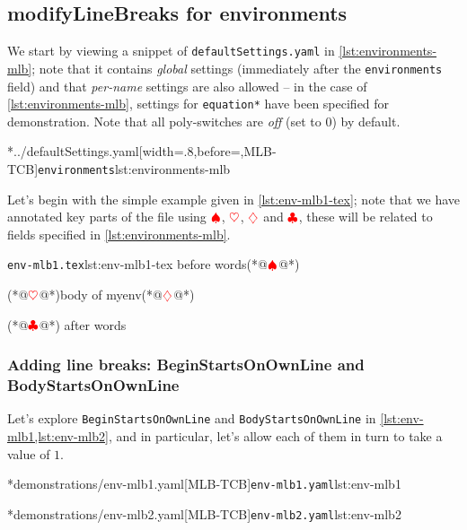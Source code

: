 \subsection{modifyLineBreaks for environments}\label{sec:modifylinebreaks-environments}
	We start by viewing a snippet of \texttt{defaultSettings.yaml} in
	\cref{lst:environments-mlb}; note that it contains \emph{global} settings
	(immediately after the \texttt{environments} field) and that
	\emph{per-name} settings are also allowed -- in the case of
	\cref{lst:environments-mlb}, settings for \texttt{equation*} have been specified
	for demonstration. Note that all poly-switches are \emph{off} (set to 0) by
	default.

	\cmhlistingsfromfile[style=modifylinebreaksEnv]*{../defaultSettings.yaml}[width=.8\linewidth,before=\centering,MLB-TCB]{\texttt{environments}}{lst:environments-mlb}

	Let's begin with the simple example given in \cref{lst:env-mlb1-tex}; note that we
	have annotated key parts of the file using $\color{red}\spadesuit$,
	$\color{red}\heartsuit$, $\color{red}\diamondsuit$ and $\color{red}\clubsuit$,
	these will be related to fields specified in \cref{lst:environments-mlb}.

	\begin{cmhlistings}[style=tcblatex,escapeinside={(*@}{@*)}]{\texttt{env-mlb1.tex}}{lst:env-mlb1-tex}
before words(*@$\color{red}\spadesuit$@*) \begin{myenv}(*@$\color{red}\heartsuit$@*)body of myenv(*@$\color{red}\diamondsuit$@*)\end{myenv}(*@$\color{red}\clubsuit$@*) after words
\end{cmhlistings}

\subsubsection{Adding line breaks: BeginStartsOnOwnLine and BodyStartsOnOwnLine}
	Let's explore \texttt{BeginStartsOnOwnLine} and \texttt{BodyStartsOnOwnLine} in
	\cref{lst:env-mlb1,lst:env-mlb2}, and in particular, let's allow each of them in turn to take
	a value of $1$.

	\begin{minipage}{.45\textwidth}
		\cmhlistingsfromfile[style=yaml-LST]*{demonstrations/env-mlb1.yaml}[MLB-TCB]{\texttt{env-mlb1.yaml}}{lst:env-mlb1}
	\end{minipage}
	\hfill
	\begin{minipage}{.45\textwidth}
		\cmhlistingsfromfile[style=yaml-LST]*{demonstrations/env-mlb2.yaml}[MLB-TCB]{\texttt{env-mlb2.yaml}}{lst:env-mlb2}
	\end{minipage}

